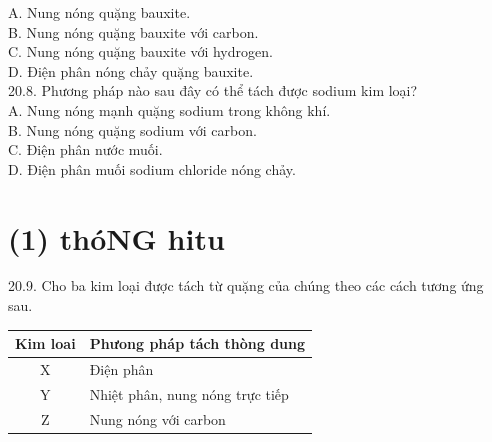 \documentclass[10pt]{article}
\begin{document}
A. Nung nóng quặng bauxite.\\
B. Nung nóng quặng bauxite với carbon.\\
C. Nung nóng quặng bauxite với hydrogen.\\
D. Điện phân nóng chảy quặng bauxite.\\
20.8. Phương pháp nào sau đây có thể tách được sodium kim loại?\\
A. Nung nóng mạnh quặng sodium trong không khí.\\
B. Nung nóng quặng sodium với carbon.\\
C. Điện phân nước muối.\\
D. Điện phân muối sodium chloride nóng chảy.

\section*{(1) thóNG hitu}
20.9. Cho ba kim loại được tách từ quặng của chúng theo các cách tương ứng sau.

\begin{center}
\begin{tabular}{|c|l|}
\hline
Kim loai & Phưong pháp tách thòng dung \\
\hline
X & Điện phân \\
\hline
Y & Nhiệt phân, nung nóng trực tiếp \\
\hline
Z & Nung nóng với carbon \\
\hline
\end{tabular}
\end{center}
\end{document}
